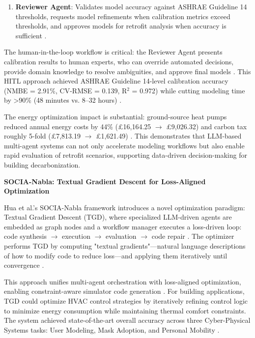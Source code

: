 \documentclass[12pt,a4paper]{article}
\begin{document}
\begin{enumerate}
  \item \textbf{Reviewer Agent}: Validates model accuracy against ASHRAE Guideline 14 thresholds, requests model refinements when calibration metrics exceed thresholds, and approves models for retrofit analysis when accuracy is sufficient \cite{ref137}.
\end{enumerate}

The human-in-the-loop workflow is critical: the Reviewer Agent presents calibration results to human experts, who can override automated decisions, provide domain knowledge to resolve ambiguities, and approve final models \cite{ref138}. This HITL approach achieved ASHRAE Guideline 14-level calibration accuracy (NMBE = 2.91\%, CV-RMSE = 0.139, R$^2$ = 0.972) while cutting modeling time by >90\% (48 minutes vs. 8--32 hours) \cite{ref139}.

The energy optimization impact is substantial: ground-source heat pumps reduced annual energy costs by 44\% (\pounds{}16,164.25 $\rightarrow$ \pounds{}9,026.32) and carbon tax roughly 5-fold (\pounds{}7,813.19 $\rightarrow$ \pounds{}1,621.49) \cite{ref140}. This demonstrates that LLM-based multi-agent systems can not only accelerate modeling workflows but also enable rapid evaluation of retrofit scenarios, supporting data-driven decision-making for building decarbonization.

\textbf{SOCIA-Nabla: Textual Gradient Descent for Loss-Aligned Optimization}

Hua et al.'s SOCIA-Nabla framework introduces a novel optimization paradigm: Textual Gradient Descent (TGD), where specialized LLM-driven agents are embedded as graph nodes and a workflow manager executes a loss-driven loop: code synthesis $\rightarrow$ execution $\rightarrow$ evaluation $\rightarrow$ code repair \cite{ref141}. The optimizer performs TGD by computing "textual gradients"---natural language descriptions of how to modify code to reduce loss---and applying them iteratively until convergence \cite{ref142}.

This approach unifies multi-agent orchestration with loss-aligned optimization, enabling constraint-aware simulator code generation \cite{ref143}. For building applications, TGD could optimize HVAC control strategies by iteratively refining control logic to minimize energy consumption while maintaining thermal comfort constraints. The system achieved state-of-the-art overall accuracy across three Cyber-Physical Systems tasks: User Modeling, Mask Adoption, and Personal Mobility \cite{ref144}.
\end{document}
